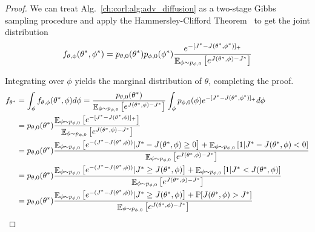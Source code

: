 \begin{proof}
    We can treat Alg.~\ref{ch:corl:alg:adv_diffusion} as a two-stage Gibbs sampling procedure and apply the Hammersley-Clifford Theorem~\cite{robertMonteCarloStatistical2004} to get the joint distribution
    \begin{equation}
        f_{\theta, \phi}(\theta^*, \phi^*) = p_{\theta, 0}(\theta^*) p_{\phi, 0}(\phi^*) \frac{e^{-[J^* - J(\theta^*, \phi^*)]_+}}{\mathop{\mathbb{E}}_{\phi \sim p_{\phi, 0}}\left[ e^{J(\theta^*, \phi) - J^*} \right]} \label{ch:corl:eq:joint}
    \end{equation}

    Integrating over $\phi$ yields the marginal distribution of $\theta$, completing the proof.
    \begin{align}
        f_{\theta^*} & = \int_\phi f_{\theta, \phi}(\theta^*, \phi) d\phi = \frac{p_{\theta, 0}(\theta^*)}{\mathop{\mathbb{E}}_{\phi \sim p_{\phi, 0}}\left[ e^{J(\theta^*, \phi) - J^*} \right]}  \int_\phi p_{\phi, 0}(\phi) e^{-[J^* - J(\theta^*, \phi^*)]_+} d\phi                                                                               \\
                     & = p_{\theta, 0}(\theta^*)\frac{\mathop{\mathbb{E}}_{\phi \sim p_{\phi, 0}}\left[ e^{-[J^* - J(\theta^*, \phi)]_+} \right]}{\mathop{\mathbb{E}}_{\phi \sim p_{\phi, 0}}\left[ e^{J(\theta^*, \phi) - J^*} \right]}                                                                                                                     \\
                     & = p_{\theta, 0}(\theta^*)\frac{\mathop{\mathbb{E}}_{\phi \sim p_{\phi, 0}}\left[ e^{-(J^* - J(\theta^*, \phi))} | J^* - J(\theta^*, \phi) \geq 0 \right] + \mathop{\mathbb{E}}_{\phi \sim p_{\phi, 0}}\left[ 1 | J^* - J(\theta^*, \phi) < 0 \right]}{\mathop{\mathbb{E}}_{\phi \sim p_{\phi, 0}}\left[ e^{J(\theta^*, \phi) - J^*} \right]} \\
                     & = p_{\theta, 0}(\theta^*)\frac{\mathop{\mathbb{E}}_{\phi \sim p_{\phi, 0}}\left[ e^{-(J^* - J(\theta^*, \phi))} | J^* \geq J(\theta^*, \phi) \right] + \mathop{\mathbb{E}}_{\phi \sim p_{\phi, 0}}\left[ 1 | J^* < J(\theta^*, \phi) \right]}{\mathop{\mathbb{E}}_{\phi \sim p_{\phi, 0}}\left[ e^{J(\theta^*, \phi) - J^*} \right]}         \\
                     & = p_{\theta, 0}(\theta^*)\frac{\mathop{\mathbb{E}}_{\phi \sim p_{\phi, 0}}\left[ e^{-(J^* - J(\theta^*, \phi))} | J^* \geq J(\theta^*, \phi) \right] + \mathbb{P}[J(\theta^*, \phi) > J^*]}{\mathop{\mathbb{E}}_{\phi \sim p_{\phi, 0}}\left[ e^{J(\theta^*, \phi) - J^*} \right]}                                                    \\
    \end{align}
\end{proof}

